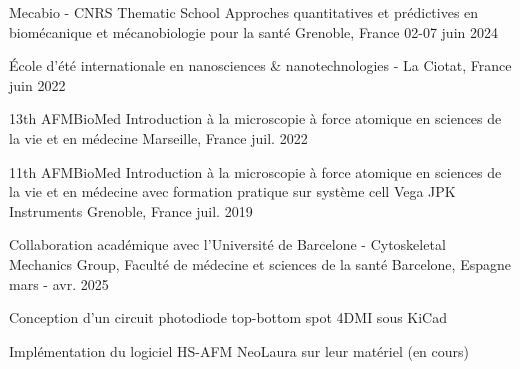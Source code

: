 

\begin{cvhonors}
  \cvhonor
    {Mecabio - CNRS Thematic School}
    {Approches quantitatives et pr\'edictives en biom\'ecanique et m\'ecanobiologie pour la sant\'e}
    {Grenoble, France}
    {02-07 juin 2024}
    {}

  \cvhonor
  	{}
  	{\'Ecole d'\'et\'e internationale en nanosciences \& nanotechnologies - }
  	{La Ciotat, France}
  	{juin 2022}

  \cvhonor
  	{13th AFMBioMed}
  	{Introduction \`a la microscopie \`a force atomique en sciences de la vie et en m\'edecine}
  	{Marseille, France}
  	{juil. 2022}

  \cvhonor
  	{11th AFMBioMed}
  	{Introduction \`a la microscopie \`a force atomique en sciences de la vie et en m\'edecine avec formation pratique sur syst\`eme cell Vega JPK Instruments}
  	{Grenoble, France}
  	{juil. 2019}

\end{cvhonors}


\begin{cventries}

  \cventry
    {Collaboration acad\'emique avec l'Universit\'e de Barcelone}
    { - Cytoskeletal Mechanics Group, Facult\'e de m\'edecine et sciences de la sant\'e}
    {Barcelone, Espagne}
    {mars - avr. 2025}
    {
      \begin{cvitems}
        \item{Conception d'un circuit photodiode top-bottom spot 4DMI sous KiCad}
        \item{Impl\'ementation du logiciel HS-AFM NeoLaura sur leur mat\'eriel (en cours)}
      \end{cvitems}
    }

\end{cventries}
